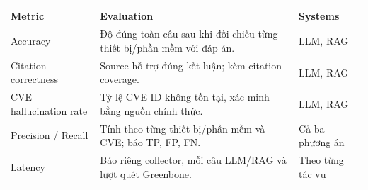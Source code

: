 \documentclass[11pt,a4paper]{article}
\renewcommand{\arraystretch}{1.10}
\newenvironment{flow}{\par\vspace{2pt}\begingroup\centering\small}{\par\endgroup\vspace{2pt}}
\begin{document}
\begin{flow}
\renewcommand{\arraystretch}{1.22}
\renewcommand{\tabularxcolumn}[1]{m{#1}}
\begin{tabularx}{\linewidth}{@{}M{3.2cm}Yp{3.3cm}@{}}
\toprule
{}
\textbf{Metric} & \textbf{Evaluation} & \textbf{Systems}\\
\midrule
Accuracy & Độ đúng toàn câu sau khi đối chiếu từng thiết bị/phần mềm với đáp án. & LLM, RAG\\
Citation correctness & Source hỗ trợ đúng kết luận; kèm citation coverage. & LLM, RAG\\
CVE hallucination rate & Tỷ lệ CVE ID không tồn tại, xác minh bằng nguồn chính thức. & LLM, RAG\\
Precision / Recall & Tính theo từng thiết bị/phần mềm và CVE; báo TP, FP, FN. & Cả ba phương án\\
Latency & Báo riêng collector, mỗi câu LLM/RAG và lượt quét Greenbone. & Theo từng tác vụ\\
\bottomrule
\end{tabularx}
\end{flow}
\end{document}
